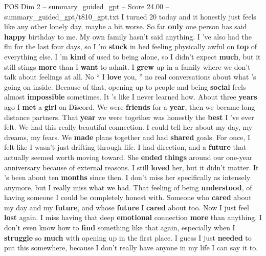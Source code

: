 \begin{textsample}{POS Dim 2 – summary\_guided\_gpt – Score 24.00 – summary\_guided\_gpt/t810\_gpt.txt}  \label{ex:f2_pos_006}
I turned 20 today and it honestly just feels like any other lonely day, maybe a bit worse.
So far \textbf{only} one person has said \textbf{happy} birthday to me.
My own family hasn't said anything.
I ’ve also had the flu for the last four days, so I ’m \textbf{stuck} in bed feeling physically awful on \textbf{top} of everything else.
I ’m \textbf{kind} of used to being alone, so I didn't expect \textbf{much}, but it still stings \textbf{more} than I \textbf{want} to admit.
I \textbf{grew} up in a family where we don't talk about feelings at all.
No “ I \textbf{love} you, ” no real conversations about what ’s going on inside.
Because of that, opening up to people and being \textbf{social} feels almost \textbf{impossible} sometimes.
It ’s like I never learned how.
About three \textbf{years} ago I \textbf{met} a \textbf{girl} on Discord.
We were \textbf{friends} for a \textbf{year}, then we became long-distance partners.
That \textbf{year} we were together was honestly the \textbf{best} I ’ve ever felt.
We had this really beautiful connection.
I could tell her about my day, my dreams, my fears.
We \textbf{made} plans together and had \textbf{shared} goals.
For once, I felt like I wasn't just drifting through life.
I had direction, and a \textbf{future} that actually seemed worth moving toward.
She \textbf{ended} \textbf{things} around our one-year anniversary because of external reasons.
I still \textbf{loved} her, but it didn't matter.
It ’s been about ten \textbf{months} since then.
I don't miss her specifically as intensely anymore, but I really miss what we had.
That feeling of being \textbf{understood}, of having someone I could be completely honest with.
Someone who \textbf{cared} about my day and my \textbf{future}, and whose \textbf{future} I \textbf{cared} about too.
Now I just feel \textbf{lost} again.
I miss having that deep \textbf{emotional} connection \textbf{more} than anything.
I don't even know how to \textbf{find} something like that again, especially when I \textbf{struggle} so \textbf{much} with opening up in the first place.
I guess I just \textbf{needed} to put this somewhere, because I don't really have anyone in my life I can say it to.

\end{textsample}
